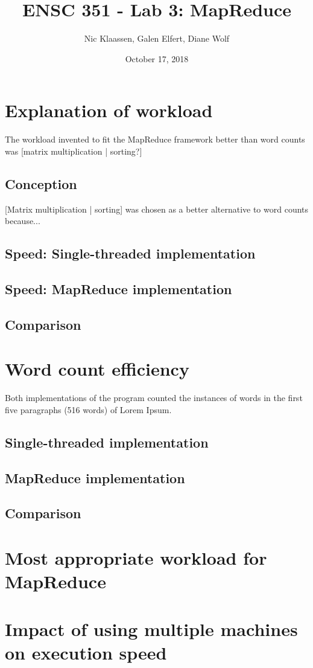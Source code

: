\documentclass[12pt, letterpaper]{article}
\begin{document}
\title{ENSC 351 - Lab 3: MapReduce}
\date{October 17, 2018}
\author{Nic Klaassen, Galen Elfert, Diane Wolf}
\maketitle
\section{Explanation of workload}
	The workload invented to fit the MapReduce framework better than word counts was {[matrix multiplication | sorting?]}
\subsection{Conception}
	{[Matrix multiplication | sorting]} was chosen as a better alternative to word counts because...
\subsection{Speed: Single-threaded implementation}
\subsection{Speed: MapReduce implementation}
\subsection{Comparison}
\section{Word count efficiency}
	Both implementations of the program counted the instances of words in the first five paragraphs (516 words) of Lorem Ipsum.
\subsection{Single-threaded implementation}
\subsection{MapReduce implementation}
\subsection{Comparison}

\section{Most appropriate workload for MapReduce}

\section{Impact of using multiple machines on execution speed}
\end{document}
